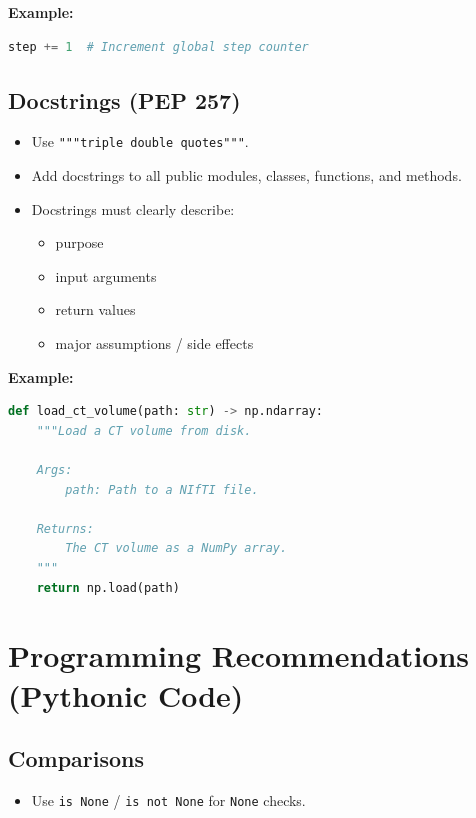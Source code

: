 \documentclass[11pt]{article}
\begin{document}
\textbf{Example:}
\begin{lstlisting}[language=Python]
step += 1  # Increment global step counter
\end{lstlisting}

\subsection{Docstrings (PEP 257)}
\begin{itemize}[label={-},leftmargin=2em,labelsep=0.6em,itemsep=0.2em]
  \item Use \texttt{"""triple double quotes"""}.
  \item Add docstrings to all public modules, classes, functions, and methods.
  \item Docstrings must clearly describe:
  \begin{itemize}[label={-},leftmargin=2em,labelsep=0.6em,itemsep=0.15em]
    \item purpose
    \item input arguments
    \item return values
    \item major assumptions / side effects
  \end{itemize}
\end{itemize}

\textbf{Example:}
\begin{lstlisting}[language=Python]
def load_ct_volume(path: str) -> np.ndarray:
    """Load a CT volume from disk.

    Args:
        path: Path to a NIfTI file.

    Returns:
        The CT volume as a NumPy array.
    """
    return np.load(path)
\end{lstlisting}

\section{Programming Recommendations (Pythonic Code)}

\subsection{Comparisons}
\begin{itemize}[label={-},leftmargin=2em,labelsep=0.6em,itemsep=0.2em]
  \item Use \texttt{is None} / \texttt{is not None} for \texttt{None} checks.
\end{itemize}
\end{document}
